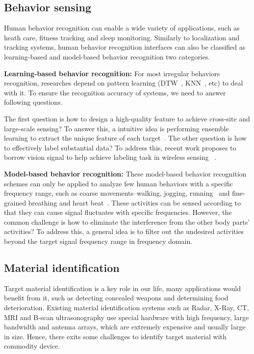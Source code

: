 \subsection{Behavior sensing} Human behavior recognition can enable a wide variety of applications, such as heath care, fitness tracking and sleep monitoring. Similarly to localization and tracking systems, human behavior recognition interfaces can also be classified as learning-based and model-based behavior recognition two categories.

\textbf{Learning-based behavior recognition:} For most irregular behaviors recognition, researches depend on pattern learning (DTW~\cite{Wang2014We}, KNN~\cite{Forster2011Incremental}, etc) to deal with it. To ensure the recognition accuracy of systems, we need to answer following questions.

The first question is how to design a high-quality feature to achieve cross-site and large-scale sensing? To answer this, a intuitive idea is performing ensemble learning to extract the unique feature of each target~\cite{CrossSense}. The other question is how to effectively label substantial data? To address this, recent work proposes to borrow vision signal to help achieve labeling task in wireless sensing ~\cite{zhao2018rf}.

\textbf{Model-based behavior recognition:} These model-based behavior recognition schemes can only be applied to analyze few human behaviors with a specific frequency range, such as coarse movements--walking, jogging, running~\cite{Wang2015Understanding} and fine-grained breathing and heart beat~\cite{Smart-homes}. These activities can be sensed according to that they can cause signal fluctuates with specific frequencies. However, the common challenge is how to eliminate the interference from the other body parts' activities? To address this, a general idea is to filter out the undesired activities beyond the target signal frequency range in frequency domain.

\subsection{Material identification} Target material identification is a key role in our life, many applications would benefit from it, such as detecting concealed weapons and determining food deterioration. Existing material identification systems such as Radar, X-Ray, CT, MRI and B-scan ultrasonography use special hardware with high frequency, large bandwidth and antenna arrays, which are extremely expensive and usually large in size. Hence, there exits some challenges to identify target material with commodity device.

